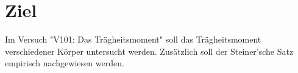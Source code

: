 \section{Ziel}
\label{sec:Ziel}

Im Versuch "V101: Das Trägheitsmoment" soll das Trägheitsmoment verschiedener Körper untersucht werden.
Zusätzlich soll der Steiner'sche Satz empirisch nachgewiesen werden.